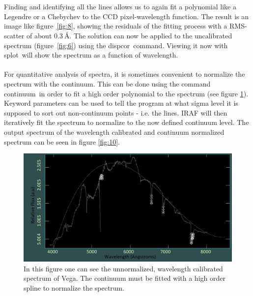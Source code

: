 \documentclass{article}
\begin{document}
~\\\\Finding and identifying all the lines allows us to again fit a polynomial like a Legendre or a Chebychev to the CCD pixel-wavelength function. The result is an image like figure~\ref{fig:8}, showing the residuals of the fitting process with a RMS-scatter of about $\SI{0.3}{\angstrom}$. The solution can now be applied to the uncalibrated spectrum (figure~\ref{fig:6}) using the \ldq dispcor\rdq ~command. Viewing it now with \ldq splot\rdq ~will show the spectrum as a function of wavelength.\\\\ For quantitative analysis of spectra, it is sometimes convenient to normalize the spectrum with the continuum. This can be done using the command \ldq continuum\rdq ~in order to fit a high order polynomial to the spectrum (see figure \ref{fig:9}). Keyword parameters can be used to tell the program at what sigma level it is supposed to sort out non-continuum points - i.e. the lines. IRAF will then iteratively fit the spectrum to normalize to the now defined continuum level. The output spectrum of the wavelength calibrated and continuum normalized spectrum can be seen in figure \ref{fig:10}.
\begin{figure}[H]
	\centering
    \includegraphics[width=1.00\textwidth]{spectroscopy/continuum_normalization_fitting.jpg}
  	\caption{In this figure one can see the unnormalized, wavelength calibrated spectrum of Vega. The continuum must be fitted with a high order spline to normalize the spectrum.}
  	\label{fig:9}
\end{figure}
\end{document}
